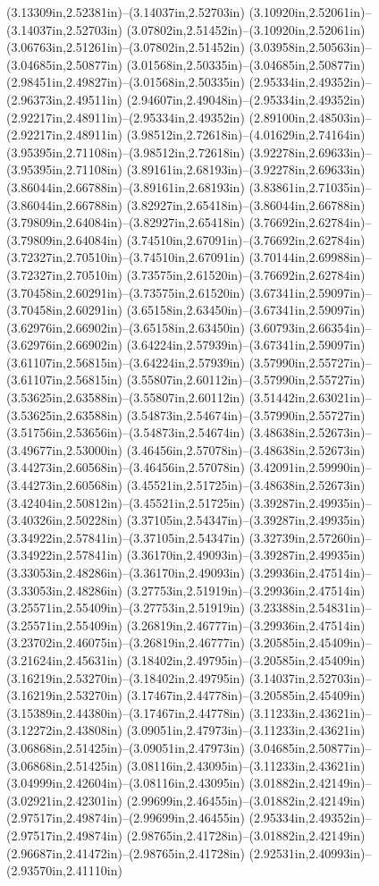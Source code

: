 (3.13309in,2.52381in)--(3.14037in,2.52703in) (3.10920in,2.52061in)--(3.14037in,2.52703in) (3.07802in,2.51452in)--(3.10920in,2.52061in) (3.06763in,2.51261in)--(3.07802in,2.51452in) (3.03958in,2.50563in)--(3.04685in,2.50877in) (3.01568in,2.50335in)--(3.04685in,2.50877in) (2.98451in,2.49827in)--(3.01568in,2.50335in) (2.95334in,2.49352in)--(2.96373in,2.49511in) (2.94607in,2.49048in)--(2.95334in,2.49352in) (2.92217in,2.48911in)--(2.95334in,2.49352in) (2.89100in,2.48503in)--(2.92217in,2.48911in) (3.98512in,2.72618in)--(4.01629in,2.74164in) (3.95395in,2.71108in)--(3.98512in,2.72618in) (3.92278in,2.69633in)--(3.95395in,2.71108in) (3.89161in,2.68193in)--(3.92278in,2.69633in) (3.86044in,2.66788in)--(3.89161in,2.68193in) (3.83861in,2.71035in)--(3.86044in,2.66788in) (3.82927in,2.65418in)--(3.86044in,2.66788in) (3.79809in,2.64084in)--(3.82927in,2.65418in) (3.76692in,2.62784in)--(3.79809in,2.64084in) (3.74510in,2.67091in)--(3.76692in,2.62784in) (3.72327in,2.70510in)--(3.74510in,2.67091in) (3.70144in,2.69988in)--(3.72327in,2.70510in) (3.73575in,2.61520in)--(3.76692in,2.62784in) (3.70458in,2.60291in)--(3.73575in,2.61520in) (3.67341in,2.59097in)--(3.70458in,2.60291in) (3.65158in,2.63450in)--(3.67341in,2.59097in) (3.62976in,2.66902in)--(3.65158in,2.63450in) (3.60793in,2.66354in)--(3.62976in,2.66902in) (3.64224in,2.57939in)--(3.67341in,2.59097in) (3.61107in,2.56815in)--(3.64224in,2.57939in) (3.57990in,2.55727in)--(3.61107in,2.56815in) (3.55807in,2.60112in)--(3.57990in,2.55727in) (3.53625in,2.63588in)--(3.55807in,2.60112in) (3.51442in,2.63021in)--(3.53625in,2.63588in) (3.54873in,2.54674in)--(3.57990in,2.55727in) (3.51756in,2.53656in)--(3.54873in,2.54674in) (3.48638in,2.52673in)--(3.49677in,2.53000in) (3.46456in,2.57078in)--(3.48638in,2.52673in) (3.44273in,2.60568in)--(3.46456in,2.57078in) (3.42091in,2.59990in)--(3.44273in,2.60568in) (3.45521in,2.51725in)--(3.48638in,2.52673in) (3.42404in,2.50812in)--(3.45521in,2.51725in) (3.39287in,2.49935in)--(3.40326in,2.50228in) (3.37105in,2.54347in)--(3.39287in,2.49935in) (3.34922in,2.57841in)--(3.37105in,2.54347in) (3.32739in,2.57260in)--(3.34922in,2.57841in) (3.36170in,2.49093in)--(3.39287in,2.49935in) (3.33053in,2.48286in)--(3.36170in,2.49093in) (3.29936in,2.47514in)--(3.33053in,2.48286in) (3.27753in,2.51919in)--(3.29936in,2.47514in) (3.25571in,2.55409in)--(3.27753in,2.51919in) (3.23388in,2.54831in)--(3.25571in,2.55409in) (3.26819in,2.46777in)--(3.29936in,2.47514in) (3.23702in,2.46075in)--(3.26819in,2.46777in) (3.20585in,2.45409in)--(3.21624in,2.45631in) (3.18402in,2.49795in)--(3.20585in,2.45409in) (3.16219in,2.53270in)--(3.18402in,2.49795in) (3.14037in,2.52703in)--(3.16219in,2.53270in) (3.17467in,2.44778in)--(3.20585in,2.45409in) (3.15389in,2.44380in)--(3.17467in,2.44778in) (3.11233in,2.43621in)--(3.12272in,2.43808in) (3.09051in,2.47973in)--(3.11233in,2.43621in) (3.06868in,2.51425in)--(3.09051in,2.47973in) (3.04685in,2.50877in)--(3.06868in,2.51425in) (3.08116in,2.43095in)--(3.11233in,2.43621in) (3.04999in,2.42604in)--(3.08116in,2.43095in) (3.01882in,2.42149in)--(3.02921in,2.42301in) (2.99699in,2.46455in)--(3.01882in,2.42149in) (2.97517in,2.49874in)--(2.99699in,2.46455in) (2.95334in,2.49352in)--(2.97517in,2.49874in) (2.98765in,2.41728in)--(3.01882in,2.42149in) (2.96687in,2.41472in)--(2.98765in,2.41728in) (2.92531in,2.40993in)--(2.93570in,2.41110in) 